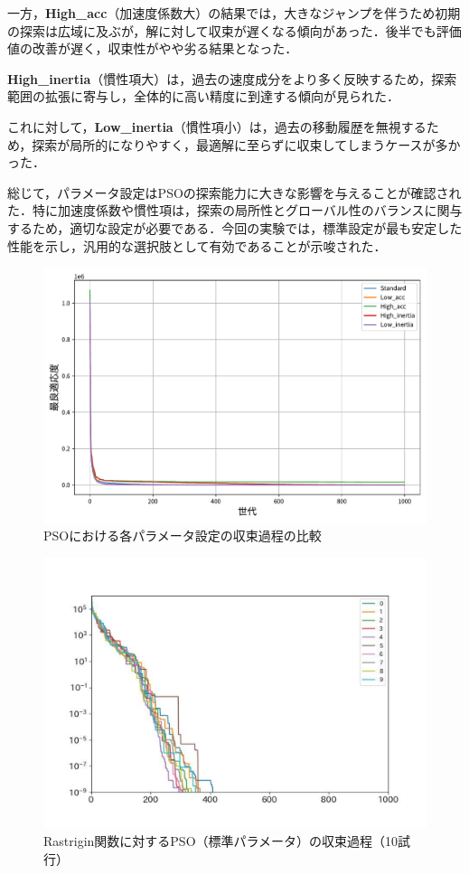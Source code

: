 一方，\textbf{High\_acc}（加速度係数大）の結果では，大きなジャンプを伴うため初期の探索は広域に及ぶが，解に対して収束が遅くなる傾向があった．後半でも評価値の改善が遅く，収束性がやや劣る結果となった．

\textbf{High\_inertia}（慣性項大）は，過去の速度成分をより多く反映するため，探索範囲の拡張に寄与し，全体的に高い精度に到達する傾向が見られた．

これに対して，\textbf{Low\_inertia}（慣性項小）は，過去の移動履歴を無視するため，探索が局所的になりやすく，最適解に至らずに収束してしまうケースが多かった．

総じて，パラメータ設定はPSOの探索能力に大きな影響を与えることが確認された．特に加速度係数や慣性項は，探索の局所性とグローバル性のバランスに関与するため，適切な設定が必要である．今回の実験では，標準設定が最も安定した性能を示し，汎用的な選択肢として有効であることが示唆された．

\begin{figure}[H]
    \centering
    \includegraphics[width=0.9\linewidth]{figure/kadai2_comparison_graph.pdf}
    \caption{PSOにおける各パラメータ設定の収束過程の比較}
    \label{fig:kadai2_comparison}
\end{figure}

\begin{figure}[H]
    \centering
    \includegraphics[width=0.9\linewidth]{figure/kadai2_result_graph_fixed.pdf}
    \caption{Rastrigin関数に対するPSO（標準パラメータ）の収束過程（10試行）}
    \label{fig:kadai2result}
\end{figure}

